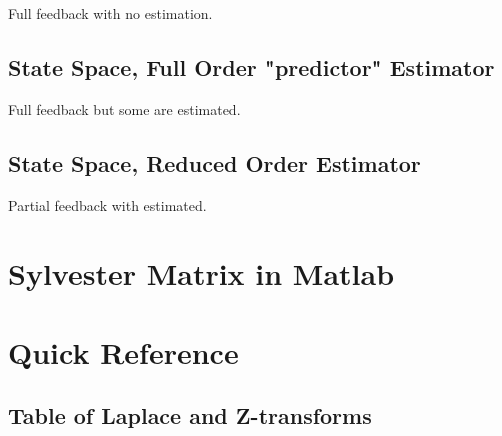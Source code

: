 \documentclass{article}
\begin{document}
Full feedback with no estimation.

\subsection{State Space, Full Order "predictor" Estimator}

Full feedback but some are estimated.

\subsection{State Space, Reduced Order Estimator}

Partial feedback with estimated.

\clearpage
\printbibliography[heading=bibintoc]

\clearpage
\appendix

\section{Sylvester Matrix in Matlab}




\section{Quick Reference}

\subsection{Table of Laplace and Z-transforms}
\end{document}
